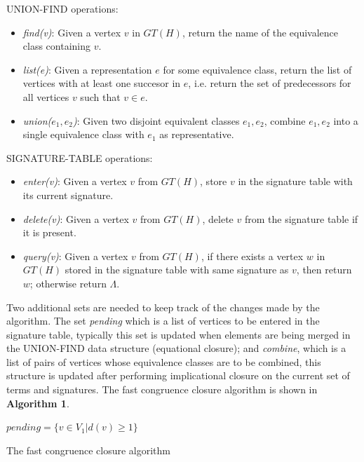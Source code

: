 UNION-FIND operations:
\begin{itemize}
\item \textit{find(v)}: Given a vertex $v$ in $GT(H)$, return the name of the equivalence
  class containing $v$.
\item \textit{list(e)}: Given a representation $e$ for some equivalence class, return
  the list of vertices with at least one succesor in $e$, i.e. return the set of
  predecessors for all vertices $v$ such that $v \in e$.
\item \textit{union($e_1, e_2$)}: Given two disjoint equivalent classes $e_1, e_2$, combine
  $e_1, e_2$ into a single equivalence class with $e_1$ as representative.
\end{itemize}

SIGNATURE-TABLE operations:
\begin{itemize}
\item \textit{enter(v)}: Given a vertex $v$ from $GT(H)$, store $v$ in the signature
  table with its current signature.
\item \textit{delete(v)}: Given a vertex $v$ from $GT(H)$, delete $v$ from the
  signature table if it is present.
\item \textit{query(v)}: Given a vertex $v$ from $GT(H)$, if there exists a vertex $w$ in
  $GT(H)$ stored in the signature table with same signature as $v$, then return $w$; otherwise
  return $\Lambda$.
\end{itemize}

Two additional sets are needed to keep track of the changes made by the algorithm. The set
\textit{pending} which is a list of vertices to be entered in the signature table, typically
this set is updated when elements are being merged in the UNION-FIND data structure
(equational closure); and \textit{combine}, which is a list of pairs of vertices whose
equivalence classes are to be combined, this structure is updated after performing implicational
closure on the current set of terms and signatures. The fast congruence closure algorithm
is shown in \textbf{Algorithm 1}.

\label{fastCongruenceClosureAlg}
\begin{algorithm}[h]
  $pending = \{v \in V_1 \vert d(v) \geq 1\}$\;
  \caption{The fast congruence closure algorithm}
\end{algorithm}

